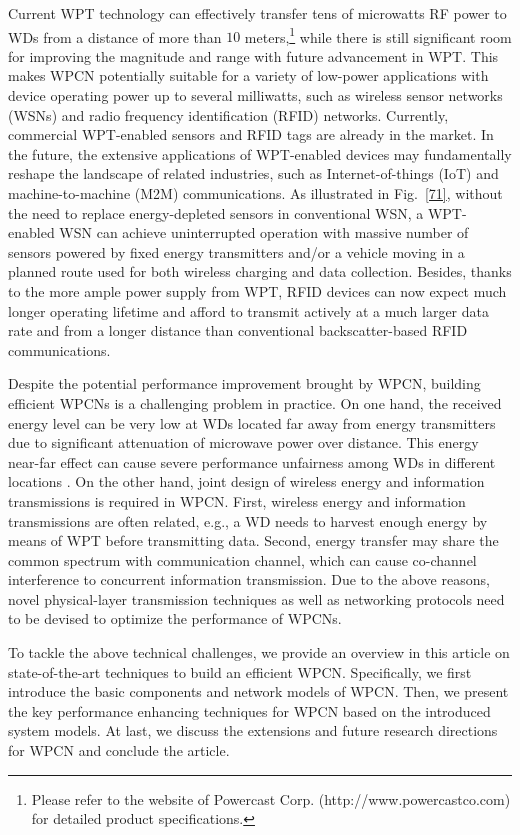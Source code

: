 \documentclass[journal, draftcls, one column, 12pt]{IEEEtran}
\begin{document}
Current WPT technology can effectively transfer tens of microwatts RF power to WDs from a distance of more than $10$ meters,\footnote{Please refer to the website of Powercast Corp. (http://www.powercastco.com) for detailed product specifications.} while there is still significant room for improving the magnitude and range with future advancement in WPT. This makes WPCN potentially suitable for a variety of low-power applications with device operating power up to several milliwatts, such as wireless sensor networks (WSNs) and radio frequency identification (RFID) networks. Currently, commercial WPT-enabled sensors and RFID tags are already in the market. In the future, the extensive applications of WPT-enabled devices may fundamentally reshape the landscape of related industries, such as Internet-of-things (IoT) and machine-to-machine (M2M) communications. As illustrated in Fig.~\ref{71}, without the need to replace energy-depleted sensors in conventional WSN, a WPT-enabled WSN can achieve uninterrupted operation with massive number of sensors powered by fixed energy transmitters and/or a vehicle moving in a planned route used for both wireless charging and data collection. Besides, thanks to the more ample power supply from WPT, RFID devices can now expect much longer operating lifetime and afford to transmit actively at a much larger data rate and from a longer distance than conventional backscatter-based RFID communications.

Despite the potential performance improvement brought by WPCN, building efficient WPCNs is a challenging problem in practice. On one hand, the received energy level can be very low at WDs located far away from energy transmitters due to significant attenuation of microwave power over distance. This energy near-far effect can cause severe performance unfairness among WDs in different locations \cite{2014:Ju}. On the other hand, joint design of wireless energy and information transmissions is required in WPCN. First, wireless energy and information transmissions are often related, e.g., a WD needs to harvest enough energy by means of WPT before transmitting data. Second, energy transfer may share the common spectrum with communication channel, which can cause co-channel interference to concurrent information transmission. Due to the above reasons, novel physical-layer transmission techniques as well as networking protocols need to be devised to optimize the performance of WPCNs.

To tackle the above technical challenges, we provide an overview in this article on state-of-the-art techniques to build an efficient WPCN. Specifically, we first introduce the basic components and network models of WPCN. Then, we present the key performance enhancing techniques for WPCN based on the introduced system models. At last, we discuss the extensions and future research directions for WPCN and conclude the article.
\end{document}
